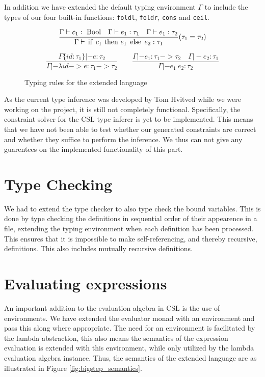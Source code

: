 \documentclass[10pt,a4paper,final,oneside,openany,article]{memoir}
\newcommand{\kw}[1]{\text{\lstinline{#1}}}
\begin{document}
In addition we have extended the default typing environment $\Gamma$
to include the types of our four built-in functions:
\lstinline{foldl}, \lstinline{foldr}, \lstinline{cons} and
\lstinline{ceil}.
\begin{figure}
  \begin{equation*}
    \frac{
      \Gamma |- c_1 : ~\kw{Bool}
      \quad \Gamma |- e_1 : \tau_1
      \quad \Gamma |- e_1 : \tau_2
    }{
      \Gamma |- \kw{if}~ c_1 ~\kw{then}~ e_1 ~\kw{else}~ e_2 : \tau_1
    }(\tau_1=\tau_2)\label{eq:type_cond}
  \end{equation*}

\begin{equation*}
  \frac{
    \Gamma\{id : \tau_1\} |- e : \tau_2
  }{
    \Gamma |- \lambda id -> e : \tau_1 -> \tau_2
  }
  \quad \quad 
  \frac{
    \Gamma |- e_1 : \tau_1 -> \tau_2
    \quad \Gamma |- e_2 : \tau_1
  }{
    \Gamma |- e_1~ e_2 : \tau_2
  }\label{eq:type_apply}
\end{equation*}

\caption{Typing rules for the extended language}
\label{fig:typing_rules}
\end{figure}
As the current type inference was developed by Tom Hvitved while we
were working on the project, it is still not completely
functional. Specifically, the constraint solver for the CSL type
inferer is yet to be implemented. This means that we have not been
able to test whether our generated constraints are correct and whether
they suffice to perform the inference. We thus can not give any
guarentees on the implemented functionality of this part.


\section{Type Checking}
We had to extend the type checker to also type check the bound
variables. This is done by type checking the definitions in sequential
order of their appearence in a file, extending the typing environment
when each definition has been processed. This ensures that it is
impossible to make self-referencing, and thereby recursive, definitions.
This also includes mutually recursive definitions.

\section{Evaluating expressions}
An important addition to the evaluation algebra in CSL is the use of
environments. We have extended the evaluator monad with an environment
and pass this along where appropriate. The need for an environment is
facilitated by the lambda abstraction, this also means the semantics
of the expression evaluation is extended with this environment, while
only utilized by the lambda evaluation algebra instance. Thus, the
semantics of the extended language are as illustrated in Figure
\ref{fig:bigstep_semantics}.
\end{document}
